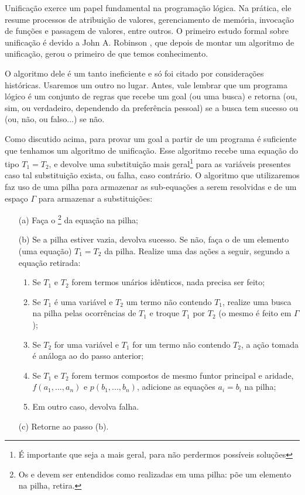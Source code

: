 \documentclass{article}
\begin{document}
Unificação exerce um papel fundamental na programação lógica. Na
prática, ele resume processos de atribuição de valores, gerenciamento
de memória, invocação de funções e passagem de valores, entre
outros. O primeiro estudo formal sobre unificação é devido a John
A. Robinson \cite{robinson}, que depois de montar um algoritmo de
unificação, gerou o primeiro de que temos conhecimento. 

O algoritmo dele é um tanto ineficiente e só foi citado por
considerações históricas. Usaremos um outro no lugar. Antes, vale lembrar que um
programa lógico é um conjunto de regras que recebe um goal (ou uma
busca) e retorna  (ou, sim, ou verdadeiro,
dependendo da preferência pessoal) se a busca tem sucesso ou
 (ou, não, ou falso...) se não. 

Como discutido acima, para provar um goal a partir de um programa é
suficiente que tenhamos um algoritmo de unificação. Esse algoritmo
recebe uma equação do tipo $T_1 = T_2$, e devolve uma substituição
mais geral\footnote{É importante que seja a mais geral, para não
  perdermos possíveis soluções} 
para as variáveis presentes caso tal substituição exista, ou falha,
caso contrário. O algoritmo que utilizaremos faz uso de uma pilha para
armazenar as sub-equações a serem resolvidas e de um espaço 
$\Gamma$ para armazenar a substituições:

\begin{itemize}
    \item[(a)] Faça o \footnote{Os  e  devem ser entendidos como realizadas em uma pilha:  põe um elemento na pilha,  retira.} da equação na pilha;
    \item[(b)] Se a pilha estiver vazia, devolva sucesso. Se não, faça o  de um elemento (uma equação) $T_1 = T_2$ da pilha. Realize uma das ações a seguir, segundo a equação retirada:
      \begin{enumerate}
        \item Se $T_1$ e $T_2$ forem termos unários idênticos, nada precisa ser feito;
        \item Se $T_1$ é uma variável e $T_2$ um termo não contendo $T_1$, realize uma busca na pilha pelas ocorrências de $T_1$ e troque $T_1$ por $T_2$ (o mesmo é feito em $\Gamma$);
        \item Se $T_2$ for uma variável e $T_1$ for um termo não contendo $T_2$, a ação tomada é análoga ao do passo anterior;
        \item Se $T_1$ e $T_2$ forem termos compostos de mesmo funtor principal e aridade, $f(a_1, ..., a_n)$ e $p(b_1, ..., b_n)$, adicione as equações $a_i = b_i$ na pilha;
        \item Em outro caso, devolva falha.
      \end{enumerate}
    \item[(c)] Retorne ao passo (b).
\end{itemize}
\end{document}
